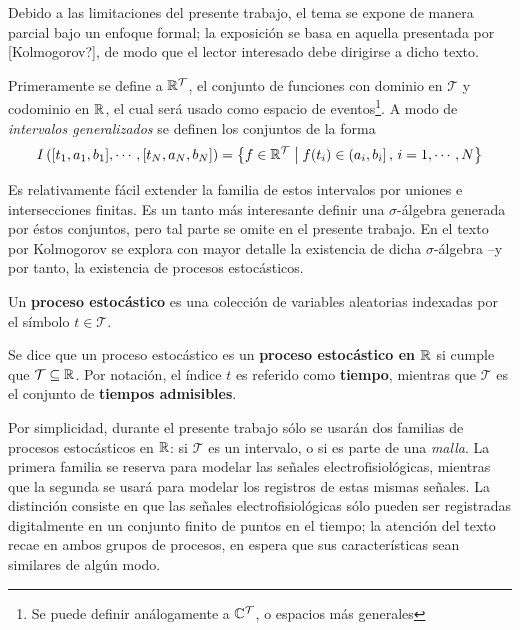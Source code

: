 Debido a las limitaciones del presente trabajo, el tema se expone de manera parcial bajo un enfoque formal; la exposición se basa en aquella presentada por [Kolmogorov?], de modo que el lector interesado debe dirigirse a dicho texto.

Primeramente se define a $\mathbb{R}^{\mathcal{T}}$, el conjunto de funciones con dominio en $\mathcal{T}$ y codominio en $\mathbb{R}$, el cual será usado como espacio de eventos\footnote{Se puede definir análogamente a $\mathbb{C}^{\mathcal{T}}$, o espacios más generales}. 
%
A modo de \textit{intervalos generalizados} se definen los conjuntos de la forma
\begin{equation}
I\left( [t_1, a_1, b_1], \cdots, [t_N, a_N, b_N] \right) = 
\left\{ f \in \mathbb{R}^{\mathcal{T}} \mathrel{}\middle|\mathrel{} f(t_i) \in (a_i, b_i] \, , \, i = 1, \cdots, N \right\}
\end{equation}

Es relativamente fácil extender la familia de estos intervalos por uniones e intersecciones finitas. Es un tanto más interesante definir una $\sigma$-álgebra generada por éstos conjuntos, pero tal parte se omite en el presente trabajo.
%
En el texto por Kolmogorov se explora con mayor detalle la existencia de dicha $\sigma$-álgebra --y por tanto, la existencia de procesos estocásticos.

\begin{definicion}
Un \textbf{proceso estocástico} \xt es una colección de variables aleatorias indexadas por el símbolo $t\in\mathcal{T}$.
\end{definicion}

\begin{definicion}
Se dice que un proceso estocástico \xt es un \textbf{proceso estocástico en $\mathbb{R}$} si cumple que $\mathcal{T} \subseteq \mathbb{R}$.
%
Por notación, el índice $t$ es referido como \textbf{tiempo}, mientras que $\mathcal{T}$ es el conjunto de \textbf{tiempos admisibles}.
\end{definicion}

Por simplicidad, durante el presente trabajo sólo se usarán dos familias de procesos estocásticos en $\mathbb{R}$: si $\mathcal{T}$ es un intervalo, o si es parte de una \textit{malla}. 
%
La primera familia se reserva para modelar las señales electrofisiológicas, mientras que la segunda se usará para modelar los registros de estas mismas señales.
%
La distinción consiste en que las señales electrofisiológicas sólo pueden ser registradas digitalmente en un conjunto finito de puntos en el tiempo; la atención del texto recae en ambos grupos de procesos, en espera que sus características sean similares de algún modo.

